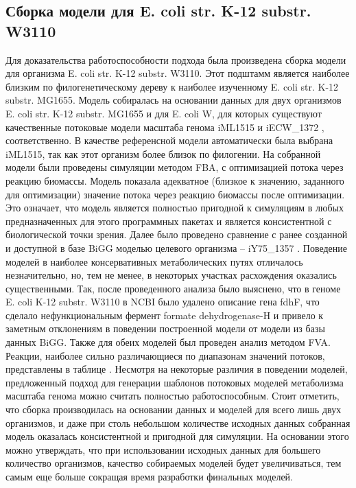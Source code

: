\subsection{Сборка модели для E. coli str. K-12 substr. W3110}

Для доказательства работоспособности подхода была произведена сборка модели для организма E. coli str. K-12 substr. W3110. Этот подштамм является наиболее близким по филогенетическому дереву к наиболее изученному E. coli str. K-12 substr. MG1655. Модель собиралась на основании данных для двух организмов E. coli str. K-12 substr. MG1655 и для E. coli W, для которых существуют качественные потоковые модели масштаба генома iML1515  и iECW\_1372 , соответственно. В качестве референсной модели автоматически была выбрана iML1515, так как этот организм более близок по филогении. На собранной модели были проведены симуляции методом FBA, с оптимизацией потока через реакцию биомассы. Модель показала адекватное (близкое к значению, заданного для оптимизации) значение потока через реакцию биомассы после оптимизации. Это означает, что модель является полностью пригодной к симуляциям в любых предназначенных для этого программных пакетах и является консистентной с биологической точки зрения.
Далее было проведено сравнение с ранее созданной и доступной в базе BiGG моделью целевого организма -- iY75\_1357 . Поведение моделей в наиболее консервативных метаболических путях отличалось незначительно, но, тем не менее, в некоторых участках расхождения оказались существенными. Так, после проведенного анализа было выяснено, что в геноме E. coli K-12 substr. W3110 в NCBI было удалено описание гена fdhF, что сделало нефункциональным фермент formate dehydrogenase-H и привело к заметным отклонениям в поведении построенной модели от модели из базы данных BiGG. Также для обеих моделей был проведен анализ методом FVA. Реакции, наиболее сильно различающиеся по диапазонам значений потоков, представлены в таблице . Несмотря на некоторые различия в поведении моделей, предложенный подход для генерации шаблонов потоковых моделей метаболизма масштаба генома можно считать полностью работоспособным.
Стоит отметить, что сборка производилась на основании данных и моделей для всего лишь двух организмов, и даже при столь небольшом количестве исходных данных собранная модель оказалась консистентной и пригодной для симуляции. На основании этого можно утверждать, что при использовании исходных данных для большего количество организмов, качество собираемых моделей будет увеличиваться, тем самым еще больше сокращая время разработки финальных моделей.

